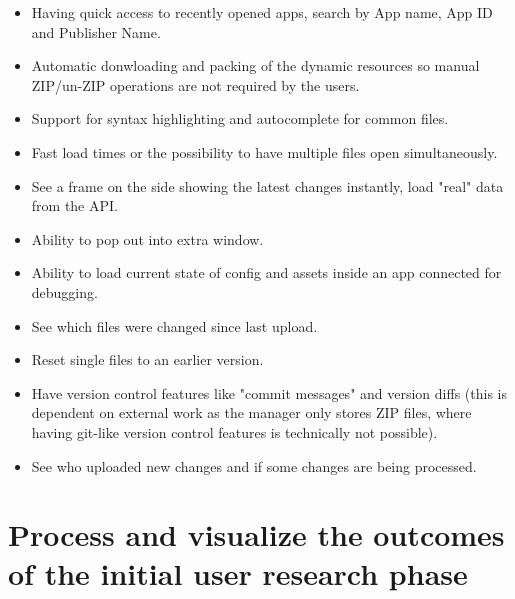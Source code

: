 \begin{description}[nosep]
  \item[App Selection] \leavevmode
  \begin{itemize}
    \item Having quick access to recently opened apps, search by App name, App ID and Publisher Name.
  \end{itemize}
  \item[App Editing] \leavevmode
  \begin{itemize}
    \item Automatic donwloading and packing of the dynamic resources so manual ZIP/un-ZIP operations are not required by the users.
    \item Support for syntax highlighting and autocomplete for common files.
    \item Fast load times or the possibility to have multiple files open simultaneously.
  \end{itemize}
  \item[App Preview]\leavevmode
   \begin{itemize}
    \item See a frame on the side showing the latest changes instantly, load "real" data from the API.
    \item Ability to pop out into extra window.
    \item Ability to load current state of config and assets inside an app connected for debugging.
  \end{itemize}
  \item[Dynamic Resource Change Management] \leavevmode
  \begin{itemize}
    \item See which files were changed since last upload.
    \item Reset single files to an earlier version.
    \item Have version control features like "commit messages" and version diffs (this is dependent on external work as the \Gls{manager} only stores ZIP files, where having git-like version control features is technically not possible).
    \item See who uploaded new changes and if some changes are being processed.
  \end{itemize}
\end{description}


\section{Process and visualize the outcomes of the initial user research phase}

